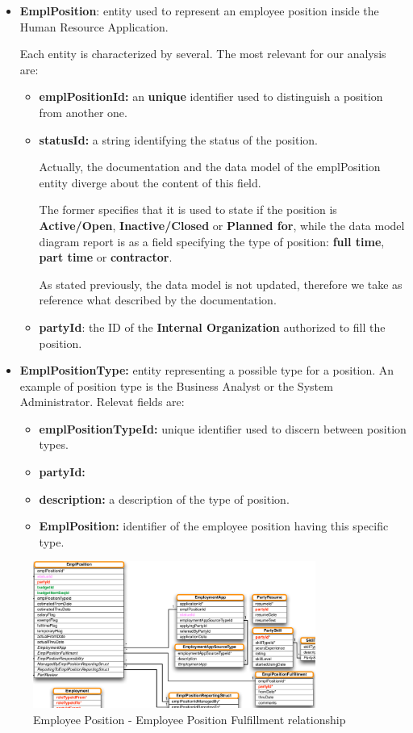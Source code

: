\begin{itemize}
	\item \textbf{EmplPosition}: entity used to represent an employee position inside the Human Resource Application.

	Each entity is characterized by several. The most relevant for our analysis are:


	\begin{itemize}
		\item \textbf{emplPositionId:} an \textbf{unique} identifier used to distinguish a position from another one.
		\item \textbf{statusId:} a string identifying the status of the position.

		Actually, the documentation and the data model of the emplPosition entity diverge about the content of this field.

		The former specifies that it is used to state if the position is \textbf{Active/Open}, \textbf{Inactive/Closed} or \textbf{Planned for}, while the data model diagram report is as a field specifying the type of position: \textbf{full time}, \textbf{part time} or \textbf{contractor}.

		As stated previously, the data model is not updated, therefore we take as reference what described by the documentation.
		\item \textbf{partyId}: the ID of the \textbf{Internal Organization} authorized to fill the position.
	\end{itemize}

	\item \textbf{EmplPositionType:} entity representing a possible type for a position. An example of position type is the Business Analyst or the System Administrator.
	Relevat fields are:

	\begin{itemize}
		\item \textbf{emplPositionTypeId:} unique identifier used to discern between position types.
		\item \textbf{partyId:}
		\item \textbf{description:} a description of the type of position.
		\item \textbf{EmplPosition:} identifier of the employee position having this specific type.
	\end{itemize}
\end{itemize}

\begin{figure}[H]
	\centerline{
		\includegraphics[width=350px]{../Datas/images/emplPos-fill.pdf}
	}
	\label{fig:emplPos-fill}
	\caption{Employee Position - Employee Position Fulfillment relationship}
\end{figure}

